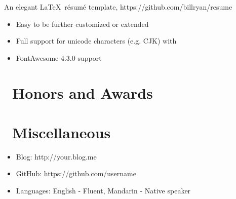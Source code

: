 \documentclass{resume}
\begin{document}
An elegant \LaTeX\ résumé template, https://github.com/billryan/resume
\begin{itemize}
  \item Easy to be further customized or extended
  \item Full support for unicode characters (e.g. CJK) with \XeLaTeX\
  \item FontAwesome 4.3.0 support
\end{itemize}

\section{\faHeartO\ Honors and Awards}

\section{\faInfo\ Miscellaneous}
\begin{itemize}[parsep=0.5ex]
  \item Blog: http://your.blog.me
  \item GitHub: https://github.com/username
  \item Languages: English - Fluent, Mandarin - Native speaker
\end{itemize}
\end{document}
